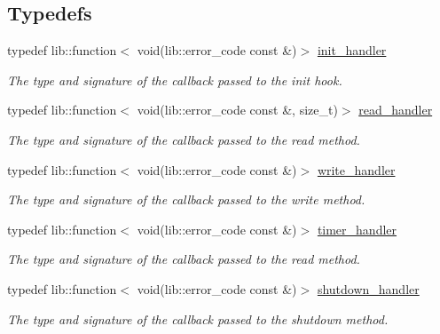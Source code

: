 \subsection*{Typedefs}
\begin{DoxyCompactItemize}
\item 
typedef lib\+::function$<$ void(lib\+::error\+\_\+code const \&)$>$ \hyperlink{namespacewebsocketpp_1_1transport_aeae75e675c1a334b3b33ab7120b480a5}{init\+\_\+handler}
\begin{DoxyCompactList}\small\item\em The type and signature of the callback passed to the init hook. \end{DoxyCompactList}\item 
typedef lib\+::function$<$ void(lib\+::error\+\_\+code const \&, size\+\_\+t)$>$ \hyperlink{namespacewebsocketpp_1_1transport_a3a9b2ed54dfcc6ebe7d7e6b4c02f53fb}{read\+\_\+handler}
\begin{DoxyCompactList}\small\item\em The type and signature of the callback passed to the read method. \end{DoxyCompactList}\item 
typedef lib\+::function$<$ void(lib\+::error\+\_\+code const \&)$>$ \hyperlink{namespacewebsocketpp_1_1transport_addf5d728159e7aa2bce2a0df947b1560}{write\+\_\+handler}
\begin{DoxyCompactList}\small\item\em The type and signature of the callback passed to the write method. \end{DoxyCompactList}\item 
typedef lib\+::function$<$ void(lib\+::error\+\_\+code const \&)$>$ \hyperlink{namespacewebsocketpp_1_1transport_a946cc56ff41139f3002149c15fd87bc9}{timer\+\_\+handler}
\begin{DoxyCompactList}\small\item\em The type and signature of the callback passed to the read method. \end{DoxyCompactList}\item 
typedef lib\+::function$<$ void(lib\+::error\+\_\+code const \&)$>$ \hyperlink{namespacewebsocketpp_1_1transport_af39aff6fc4cb76f7df0d5322b734d156}{shutdown\+\_\+handler}
\begin{DoxyCompactList}\small\item\em The type and signature of the callback passed to the shutdown method. \end{DoxyCompactList}\item 

\end{DoxyCompactItemize}
